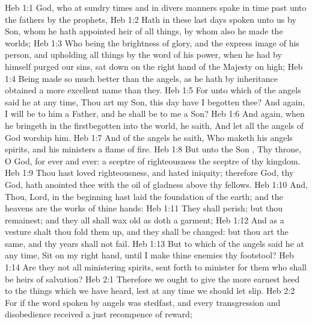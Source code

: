 \vs Heb 1:1 God, who at sundry times and in divers manners spake in time past unto the fathers by the prophets,
\vs Heb 1:2 Hath in these last days spoken unto us by  Son, whom he hath appointed heir of all things, by whom also he made the worlds;
\vs Heb 1:3 Who being the brightness of  glory, and the express image of his person, and upholding all things by the word of his power, when he had by himself purged our sins, sat down on the right hand of the Majesty on high;
\vs Heb 1:4 Being made so much better than the angels, as he hath by inheritance obtained a more excellent name than they.
\vs Heb 1:5 For unto which of the angels said he at any time, Thou art my Son, this day have I begotten thee? And again, I will be to him a Father, and he shall be to me a Son?
\vs Heb 1:6 And again, when he bringeth in the firstbegotten into the world, he saith, And let all the angels of God worship him.
\vs Heb 1:7 And of the angels he saith, Who maketh his angels spirits, and his ministers a flame of fire.
\vs Heb 1:8 But unto the Son , Thy throne, O God,  for ever and ever: a sceptre of righteousness  the sceptre of thy kingdom.
\vs Heb 1:9 Thou hast loved righteousness, and hated iniquity; therefore God,  thy God, hath anointed thee with the oil of gladness above thy fellows.
\vs Heb 1:10 And, Thou, Lord, in the beginning hast laid the foundation of the earth; and the heavens are the works of thine hands:
\vs Heb 1:11 They shall perish; but thou remainest; and they all shall wax old as doth a garment;
\vs Heb 1:12 And as a vesture shalt thou fold them up, and they shall be changed: but thou art the same, and thy years shall not fail.
\vs Heb 1:13 But to which of the angels said he at any time, Sit on my right hand, until I make thine enemies thy footstool?
\vs Heb 1:14 Are they not all ministering spirits, sent forth to minister for them who shall be heirs of salvation?
\vs Heb 2:1 Therefore we ought to give the more earnest heed to the things which we have heard, lest at any time we should let  slip.
\vs Heb 2:2 For if the word spoken by angels was stedfast, and every transgression and disobedience received a just recompence of reward;
